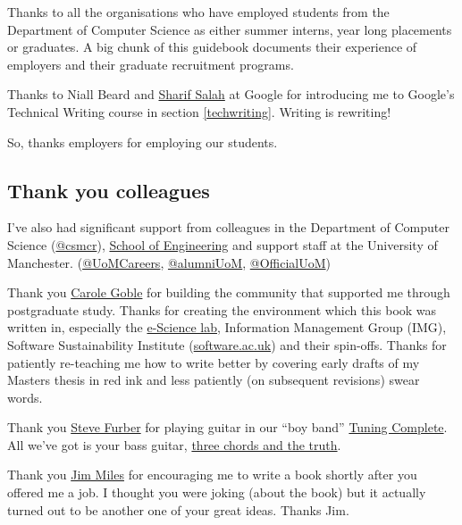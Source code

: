 \documentclass[
]{book}
\begin{document}
Thanks to all the organisations who have employed students from the Department of Computer Science as either summer interns, year long placements or graduates. A big chunk of this guidebook documents their experience of employers and their graduate recruitment programs.

Thanks to Niall Beard and \href{https://github.com/sharifsalah}{Sharif Salah} at Google for introducing me to Google's Technical Writing course in section \ref{techwriting}. Writing is rewriting!

So, thanks employers for employing our students. 🙏

\hypertarget{colleagues}{%
\subsection{Thank you colleagues}\label{colleagues}}

I've also had significant support from colleagues in the Department of Computer Science (\href{https://twitter.com/csmcr}{@csmcr}), \href{https://www.se.manchester.ac.uk/about/schools/engineering/}{School of Engineering} and support staff at the University of Manchester. (\href{https://twitter.com/UoMCareers}{@UoMCareers}, \href{https://twitter.com/alumniUoM}{@alumniUoM}, \href{https://twitter.com/OfficialUoM}{@OfficialUoM})

Thank you \href{https://en.wikipedia.org/wiki/Carole_Goble}{Carole Goble} for building the community that supported me through postgraduate study. Thanks for creating the environment which this book was written in, especially the \href{https://esciencelab.org.uk/}{e-Science lab}, Information Management Group (IMG), Software Sustainability Institute (\href{https://software.ac.uk/}{software.ac.uk}) and their spin-offs. Thanks for patiently re-teaching me how to write better by covering early drafts of my Masters thesis in red ink and less patiently (on subsequent revisions) swear words. 🤬

Thank you \href{https://en.wikipedia.org/wiki/Steve_Furber}{Steve Furber} for playing guitar in our ``boy band'' \href{https://personalpages.manchester.ac.uk/staff/duncan.hull/research.html\#tuningcomplete}{Tuning Complete}. All we've got is your bass guitar, \href{https://en.wikipedia.org/wiki/Three_Chords_and_the_Truth}{three chords and the truth}. \citep{harlan, allalongthewatchtower} 🎸

Thank you \href{https://en.wikipedia.org/wiki/James_John_Miles}{Jim Miles} for encouraging me to write a book shortly after you offered me a job. I thought you were joking (about the book) but it actually turned out to be another one of your great ideas. Thanks Jim. 🙏
\end{document}
